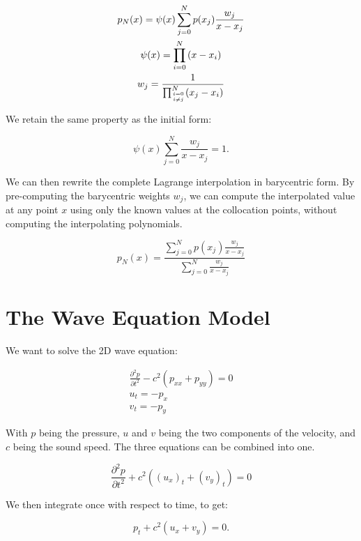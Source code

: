 \begin{gather}
	p_N(x) = \psi(x)\sum_{j = 0}^{N}p(x_j)\frac{w_j}{x - x_j} \\
	\psi(x) = \prod_{i = 0}^{N}\left ( x - x_i \right ) \\
	w_j = \frac{1}{\prod_{\genfrac{}{}{0pt}{2}{i = 0}{i \neq j}}^{N}(x_j - x_i)}
\end{gather}

\noindent
We retain the same property as the initial form:

\begin{equation}
	\psi(x)\sum_{j = 0}^{N}\frac{w_j}{x - x_j} = 1.
\end{equation}

We can then rewrite the complete Lagrange interpolation in barycentric form. By pre-computing the
barycentric weights $w_j$, we can compute the interpolated value at any point $x$ using only the
known values at the collocation points, without computing the interpolating polynomials. 

\begin{equation}
	p_N(x) = \frac{\sum_{j = 0}^{N} p(x_j)\frac{w_j}{x - x_j}}{\sum_{j = 0}^{N}\frac{w_j}{x - x_j}}
\end{equation}

\section{The Wave Equation Model} \label{section:spectral_element_method:equation}

We want to solve the 2D wave equation:

\begin{gather}
	\frac{\partial^2p}{\partial t^2} - c^2(p_{xx} + p_{yy}) = 0 \\
	u_t = - p_x \\
	v_t = -p_y
\end{gather}

With $p$ being the pressure, $u$ and $v$ being the two components of the velocity, and $c$ being the
sound speed. The three equations can be combined into one.

\begin{equation} \label{equ:2d_wave}
	\frac{\partial^2p}{\partial t^2} + c^2\left ( (u_x)_t + (v_y)_t \right ) = 0
\end{equation}

We then integrate once with respect to time, to get:

\begin{equation} \label{equ:2d_wave_integrated}
	p_t + c^2\left ( u_x + v_y \right ) = 0.
\end{equation}

